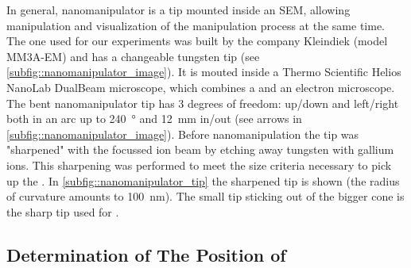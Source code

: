	In general, nanomanipulator is a tip mounted inside an SEM, allowing manipulation and visualization of the manipulation process at the same time.
	The one used for our experiments was built by the company Kleindiek (model MM3A-EM) and has a changeable tungsten tip (see \cref{subfig::nanomanipulator_image}).
	It is mouted inside a Thermo Scientific\texttrademark{} Helios NanoLab\texttrademark{}  DualBeam\texttrademark{} microscope, which combines a \fib and an electron microscope.
	The bent nanomanipulator tip has 3 degrees of freedom: up/down and left/right both in an arc up to \SI{240}{\degree} and \SI{12}{\milli\metre} in/out (see arrows in \cref{subfig::nanomanipulator_image}).
	Before nanomanipulation the tip was "sharpened" with the focussed ion beam by etching away  tungsten with gallium ions.
	This sharpening was performed to meet the size criteria necessary to pick up the \nds.
	In \cref{subfig::nanomanipulator_tip} the sharpened tip is shown (the radius of curvature amounts to \SI{100}{\nano\meter}).
	The small tip sticking out of the bigger cone is the sharp tip used for \pp.


	\subsection{Determination of The Position of \Nds} \label{subsec::position}

